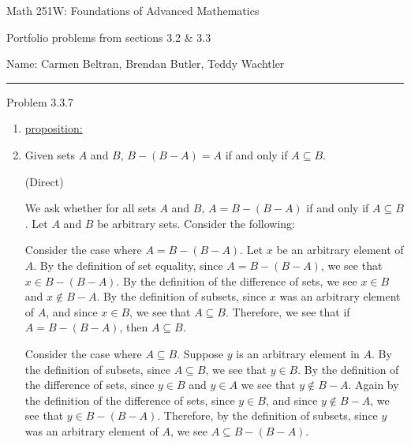 \documentclass{article}
\theoremstyle{definition}
\begin{document}
	\begin{center}
		\Large{Math 251W: Foundations of Advanced Mathematics}

		\normalsize Portfolio problems from sections 3.2 $\&$ 3.3

		\hfill Name: Carmen Beltran, Brendan Butler, Teddy Wachtler
		\hrule
		\vspace{0.4cm}
		\vspace{0.75cm}
	\end{center}


	\noindent Problem 3.3.7
	\vspace{0.3cm}
	\begin{enumerate}
		\item[iv]
		\underline{proposition:}
		\item Given sets $A$ and $B$, $B- (B - A) = A$ if and only if $A \subseteq B$.

		\vspace{.2cm}

		 (Direct)

		\vspace{.15cm}

        We ask whether for all sets $A$ and $B$, $A = B - (B - A)$ if and only if $A \subseteq B$.
        Let $A$ and $B$ be arbitrary sets.
        Consider the following:

        Consider the case where $A = B - (B - A)$.
        Let $x$ be an arbitrary element of $A$.
        By the definition of set equality, since $A = B - (B - A)$, we see that $x \in B - (B - A)$.
        By the definition of the difference of sets, we see $x \in B$ and $x \not \in B - A$.
        By the definition of subsets, since $x$ was an arbitrary element of $A$, and since $x \in B$, we see that $A \subseteq B$.
        Therefore, we see that if $A = B - (B - A)$, then $A \subseteq B$.
        
        Consider the case where $A \subseteq B$.
        Suppose $y$ is an arbitrary element in $A$.
        By the definition of subsets, since $A \subseteq B$, we see that $y \in B$.
        By the definition of the difference of sets, since  $y \in B$ and  $y \in A$ we see that $y \not \in B - A$.
        Again by the definition of the difference of sets, since $y \in B$, and since $y \not \in B - A$, we see that $y \in B - (B - A)$.
        Therefore, by the definition of subsets, since $y$ was an arbitrary element of $A$, we see $A \subseteq B - (B - A)$.
        

\end{enumerate}
\end{document}
